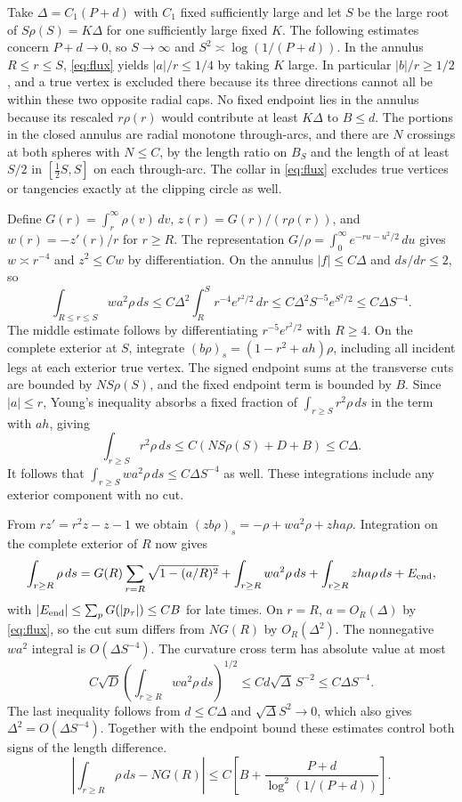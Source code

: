 Take \(\Delta=C_1(P+d)\) with \(C_1\) fixed sufficiently large and let \(S\) be the large root of \(S\rho(S)=K\Delta\) for one sufficiently large fixed \(K\). The following estimates concern \(P+d\to0\), so \(S\to\infty\) and \(S^2\asymp\log(1/(P+d))\). In the annulus \(R\le r\le S\), \eqref{eq:flux} yields \(|a|/r\le 1/4\) by taking \(K\) large. In particular \(|b|/r\ge 1/2\), and a true vertex is excluded there because its three directions cannot all be within these two opposite radial caps. No fixed endpoint lies in the annulus because its rescaled \(r\rho(r)\) would contribute at least \(K\Delta\) to \(B\le d\). The portions in the closed annulus are radial monotone through-arcs, and there are \(N\) crossings at both spheres with \(N\le C\), by the length ratio on \(B_S\) and the length of at least \(S/2\) in \([\tfrac12 S,S]\) on each through-arc. The collar in \eqref{eq:flux} excludes true vertices or tangencies exactly at the clipping circle as well.

Define \(G(r)=\int_r^\infty\rho(v)\,dv\), \(z(r)=G(r)/(r\rho(r))\), and \(w(r)=-z'(r)/r\) for \(r\ge R\). The representation \(G/\rho=\int_0^\infty e^{-ru-u^2/2}\,du\) gives \(w\asymp r^{-4}\) and \(z^2\le Cw\) by differentiation. On the annulus \(|f|\le C\Delta\) and \(ds/dr\le2\), so \[
 \int_{R\le r\le S} w a^2\rho\,ds
 \le C\Delta^2\int_R^S r^{-4}e^{r^2/2}\,dr
 \le C\Delta^2 S^{-5}e^{S^2/2}
 \le C\Delta S^{-4}.
\] The middle estimate follows by differentiating \(r^{-5}e^{r^2/2}\) with \(R\ge4\). On the complete exterior at \(S\), integrate \((b\rho)_s=(1-r^2+ah)\rho\), including all incident legs at each exterior true vertex. The signed endpoint sums at the transverse cuts are bounded by \(NS\rho(S)\), and the fixed endpoint term is bounded by \(B\). Since \(|a|\le r\), Young's inequality absorbs a fixed fraction of \(\int_{r\ge S} r^2\rho\,ds\) in the term with \(ah\), giving \[
 \int_{r\ge S}r^2\rho\,ds\le C(NS\rho(S)+D+B)\le C\Delta .
\] It follows that \(\int_{r\ge S}w a^2\rho\,ds\le C\Delta S^{-4}\) as well. These integrations include any exterior component with no cut.

From \(r z'=r^2z-z-1\) we obtain \((zb\rho)_s=-\rho+w a^2\rho+z h a\rho\). Integration on the complete exterior of \(R\) now gives \[
 \int_{r\ge R}\rho\,ds
 =G(R)\sum_{r=R}\sqrt{1-(a/R)^2}
  +\int_{r\ge R}w a^2\rho\,ds+\int_{r\ge R}z h a\rho\,ds+E_{\rm end},
\] with \(|E_{\rm end}|\le\sum_p G(|p_\tau|)\le C B\) for late times. On \(r=R\), \(a=O_R(\Delta)\) by \eqref{eq:flux}, so the cut sum differs from \(NG(R)\) by \(O_R(\Delta^2)\). The nonnegative \(wa^2\) integral is \(O(\Delta S^{-4})\). The curvature cross term has absolute value at most
\[
C\sqrt{D}\left(\int_{r\ge R} w a^2\rho\,ds\right)^{1/2}
 \le C d\sqrt{\Delta}\,S^{-2}
 \le C\Delta S^{-4}.
\]
The last inequality follows from \(d\le C\Delta\) and \(\sqrt{\Delta}S^2\to0\), which also gives \(\Delta^2=O(\Delta S^{-4})\). Together with the endpoint bound these estimates control both signs of the length difference. \begin{equation}\label{eq:outer-length}
 \left|\int_{r\ge R}\rho\,ds-N G(R)\right|
 \le C\left[B+\frac{P+d}{\log^2(1/(P+d))}\right].
\end{equation}

